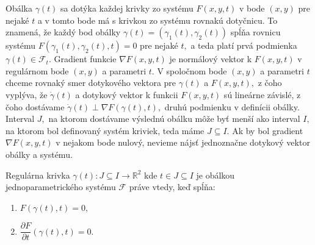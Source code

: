 Obálka $\gamma(t)$ sa dotýka každej krivky zo systému $F(x,y,t)$ v bode $(x, y)$  pre nejaké $t$ a v tomto bode má s krivkou zo systému rovnakú dotyčnicu. To znamená, že každý bod obálky ${\gamma}(t) = (\gamma_{1}(t),\gamma_{2}(t))$ spĺňa rovnicu systému $F(\gamma_{1}(t),\gamma_{2}(t),t)=0$ pre nejaké $t,$ a teda platí prvá podmienka $\gamma(t) \in \mathcal{F}_{t}$. Gradient funkcie $ \nabla F(x,y,t)$ je normálový vektor k $F(x,y,t)$ v regulárnom bode $(x,y)$ a parametri $t$. V spoločnom bode $(x,y)$ a parametri $t$ chceme rovnaký smer dotykového vektora pre $\gamma(t)$ a $F(x,y,t), $ z čoho vyplýva, že $\dot{\gamma}(t)$ a dotykový vektor k funkcii $F(x,y,t)$ sú lineárne závislé, z čoho dostávame $\dot{\gamma}(t) \perp \nabla F \left( \gamma(t), t \right), $ druhú podmienku v definícii obálky. Interval $J,$ na ktorom dostávame výslednú obálku môže byť menší ako interval $I,$ na ktorom bol definovaný systém kriviek, teda máme $J \subseteq I.$ Ak by bol gradient $\nabla F(x,y,t) $ v nejakom bode nulový, nevieme nájsť jednoznačne dotykový vektor obálky a systému. 

\begin{theorem}
Regulárna krivka $\gamma(t) \colon J \subseteq I \rightarrow \mathbb{R}^{2}$ kde $t \in J  \subseteq I$ je obálkou jednoparametrického systému $\mathcal{F}$ práve vtedy, keď spĺňa:
\begin{enumerate}
\item $F(\gamma(t), t) = 0, $ 
\item $\dfrac{\partial F}{\partial t}(\gamma(t), t) = 0.$
\end{enumerate}
\end{theorem}

